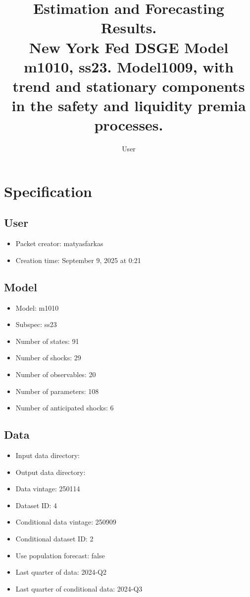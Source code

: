 \documentclass{article}
\title{Estimation and Forecasting Results. \\ New York Fed DSGE Model m1010, ss23. Model1009, with trend and stationary components in the safety and liquidity premia processes.}
\author{User}
\begin{document}
\maketitle


\section{Specification}

\subsection{User}

\begin{itemize}
  \item Packet creator: matyasfarkas
  \item Creation time: September 9, 2025 at 0:21
\end{itemize}

\subsection{Model}

\begin{itemize}
  \item Model: m1010
  \item Subspec: ss23
  \item Number of states: 91
  \item Number of shocks: 29
  \item Number of observables: 20
  \item Number of parameters: 108
  \item Number of anticipated shocks: 6
\end{itemize}

\subsection{Data}

\begin{itemize}
  \item Input data directory: 
  \item Output data directory: 
  \item Data vintage: 250114
  \item Dataset ID: 4
  \item Conditional data vintage: 250909
  \item Conditional dataset ID: 2
  \item Use population forecast: false
  \item Last quarter of data: 2024-Q2
  \item Last quarter of conditional data: 2024-Q3
\end{itemize}
\end{document}
